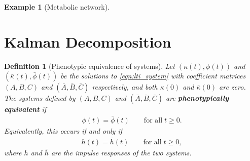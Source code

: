 \documentclass{article}
\newcommand{\1}{\mathbbm{1}}
\newtheorem{definition}{Definition}
\newtheorem{example}{Example}
\begin{document}
\begin{example}[Metabolic network]
%
%
\end{example}

\appendix

\section{Kalman Decomposition} \label{apx:kalman}
\begin{definition}[Phenotypic equivalence of systems]
    Let $(\kappa(t),\phi(t))$ and $(\bar \kappa(t),\bar \phi(t))$ be the solutions to \eqref{eqn:lti_system}
    with coefficient matrices $(A,B,C)$ and $(\bar A,\bar B,\bar C)$ respectively,
    and both $\kappa(0)$ and $\bar \kappa(0)$ are zero. 
    The systems defined by $(A,B,C)$ and $(\bar A,\bar B,\bar C)$ are
    \textbf{phenotypically equivalent} 
    if
    \begin{align*}
        \phi(t) = \bar \phi(t) \qquad \text{for all} \; t \ge 0.
    \end{align*}
    Equivalently, this occurs if and only if
    \begin{align*}
        h(t) = \bar h(t)  \qquad \text{for all} \; t \ge 0,
    \end{align*}
    where $h$ and $\bar h$ are the impulse responses of the two systems.
\end{definition}
\end{document}
